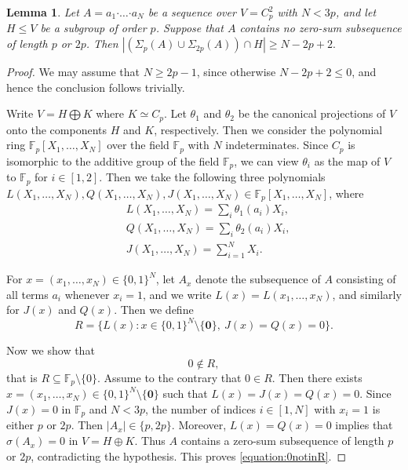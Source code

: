 \documentclass[10pt,a4paper]{amsart}
\newtheorem{lemma}{Lemma}
\begin{document}
\begin{lemma}\label{lemma:relative}
Let
$A=a_1\boldsymbol{\cdot}\ldots\boldsymbol{\cdot}a_N$
be a sequence over $V=C_p^2$ with $N<3p$, and let $H\le V$ be a
subgroup of order $p$. Suppose that $A$ contains no zero-sum
subsequence of length $p$ or $2p$. Then
$\left|\left(\Sigma_p(A)\cup\Sigma_{2p}(A)\right)\cap H\right|
\ge N-2p+2.$
\end{lemma}

\begin{proof} We may assume that $N\ge 2p-1$, since otherwise
$N-2p+2\leq0$, and hence the conclusion follows trivially.

Write $V=H\bigoplus K$ where $K\simeq C_p$. Let $\theta_1$ and $\theta_2$ be the canonical projections of $V$ onto the components $H$ and $K$, respectively.  Then we consider the polynomial ring $\mathbb F_p[X_1,\ldots,X_{N}]$ over the field $\mathbb F_p$ with $N$ indeterminates. Since $C_p$ is isomorphic to the additive group of the field $\mathbb{F}_p$, we can view $\theta_i$ as the map of $V$ to $\mathbb{F}_p$ for $i\in [1,2]$. Then we take the following three polynomials $L(X_1,\ldots,X_N), Q(X_1,\ldots,X_N), J(X_1,\ldots,X_N)\in \mathbb F_p[X_1,\ldots,X_{N}]$, where
$$\begin{aligned}
&L(X_1,\ldots,X_N)=\sum_i\theta_1(a_i)X_i,  \\ 
&Q(X_1,\ldots,X_N)=\sum_i \theta_2(a_i)X_i, \\  
&J(X_1,\ldots,X_N)=\sum_{i=1}^N X_i. \end{aligned}
$$


For $x=(x_1,\ldots,x_N)\in\{0,1\}^N$, let $A_x$ denote the
subsequence of $A$ consisting of all terms $a_i$ whenever $x_i=1$, and we write
$L(x)=L(x_1,\ldots,x_N)$, and similarly for $J(x)$ and $Q(x)$.
Then we define
\begin{equation}\label{equation:Rdefinition}
R=\{L(x):x\in\{0,1\}^N\setminus\{\mathbf 0\},
      \ J(x)=Q(x)=0\}.
\end{equation}

Now we show that
\begin{equation}\label{equation:0notinR}
0\notin R,
\end{equation}
that is $R\subseteq\mathbb F_p\setminus \{0\}$.
Assume to the contrary that $0\in R$. Then there exists
$x=(x_1,\ldots,x_N)\in\{0,1\}^N\setminus\{\mathbf 0\}$ such that
$L(x)=J(x)=Q(x)=0$. Since $J(x)=0$ in $\mathbb F_p$ and $N<3p$,
the number of indices $i\in [1,N]$ with $x_i=1$ is either $p$ or $2p$.
Then $|A_x|\in\{p,2p\}$. Moreover,
$L(x)=Q(x)=0$ implies that
$\sigma(A_x)=0$ in $V=H\oplus K$. Thus $A$ contains a zero-sum
subsequence of length $p$ or $2p$, contradicting the hypothesis.
This proves \eqref{equation:0notinR}.





\end{proof}
\end{document}
